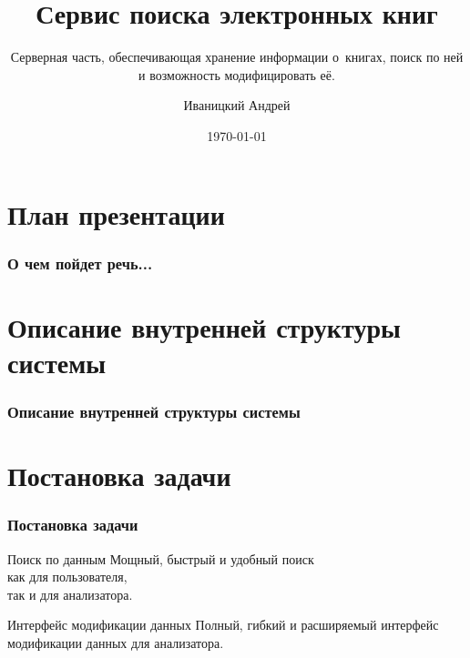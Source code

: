 \documentclass[utf8,handout]{beamer}
\title{Сервис поиска электронных книг}
\subtitle{Серверная часть, обеспечивающая хранение информации о~книгах, поиск по ней и возможность модифицировать её.}
\author{Иваницкий Андрей}
\institute{Санкт-Петербургский Академический Университет РАН}
\date{\today}
\begin{document}
\begin{frame}
	\titlepage
\end{frame}

\section*{План презентации}
	\begin{frame}
		\frametitle{О чем пойдет речь...}
		\tableofcontents[pausesections]
	\end{frame}

\section{Описание внутренней структуры системы}
	\begin{frame}
		\frametitle{Описание внутренней структуры системы}
%

	\end{frame}


\section{Постановка задачи}
	\begin{frame}
		\frametitle{Постановка задачи}
		\begin{block}{Поиск по данным}
			Мощный, быстрый и удобный поиск\\
			как для пользователя,\\
			так и для анализатора.
		\end{block}
		\begin{block}{Интерфейс модификации данных}
			Полный, гибкий и расширяемый интерфейс модификации данных для анализатора.
		\end{block}
	\end{frame}
\end{document}
